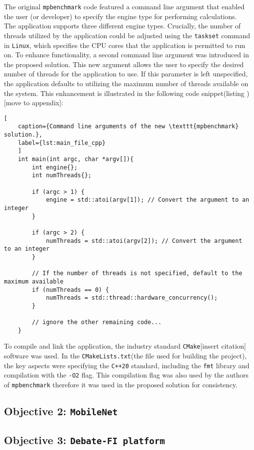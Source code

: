 The original \texttt{mpbenchmark} code featured a command line argument that enabled the user (or developer) to specify the engine type for performing calculations. The application supports three different engine types. Crucially, the number of threads utilized by the application could be adjusted using the \texttt{taskset} command in \texttt{Linux}, which specifies the CPU cores that the application is permitted to run on. To enhance functionality, a second command line argument was introduced in the proposed solution. This new argument allows the user to specify the desired number of threads for the application to use. If this parameter is left unspecified, the application defaults to utilizing the maximum number of threads available on the system. This enhancement is illustrated in the following code snippet(listing \label{lst:main})[move to appendix]:

\begin{lstlisting}[
	caption={Command line arguments of the new \texttt{mpbenchmark} solution.},
	label={lst:main_file_cpp}
	]
	int main(int argc, char *argv[]){
		int engine{};
		int numThreads{};
		
		if (argc > 1) {
			engine = std::atoi(argv[1]); // Convert the argument to an integer
		}
		
		if (argc > 2) {
			numThreads = std::atoi(argv[2]); // Convert the argument to an integer
		}
		
		// If the number of threads is not specified, default to the maximum available
		if (numThreads == 0) {
			numThreads = std::thread::hardware_concurrency();
		}
		
		// ignore the other remaining code...
	}
\end{lstlisting}


To compile and link the application, the industry standard \texttt{CMake}[insert citation] software was used. In the \texttt{CMakeLists.txt}(the file used for building the project), the key aspects were specifying the \texttt{C++20} standard, including the \texttt{fmt} library and compilation with the \texttt{-O2} flag. This compilation flag was also used by the authors of \texttt{mpbenchmark}\cite{mpbenchmark_paper} therefore it was used in the proposed solution for consistency. 

\subsection{Objective 2: \texttt{MobileNet}}
\subsection{Objective 3: \texttt{Debate-FI platform}}